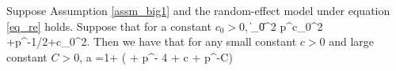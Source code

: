 \begin{proposition}\label{lem_hat_v}
    Suppose Assumption \ref{assm_big1} and the random-effect model under equation \eqref{eq_re} holds. 
    Suppose that for a constant $c_0>0$,
	\be\label{para_rel}
	    \|\beta_0\|^2 \ge p^{c_0}\mu^2 +p^{-1/2+c_0}\sigma^2.
	\ee
    Then we have that for any small constant $c>0$ and large constant $ C>0$,
	\be\label{hatw_add1}
	 \hat a =1+ \OO\left( + p^{- 4 + c}  + p^{-C}\right) \quad {}
	\ee
\end{proposition}




